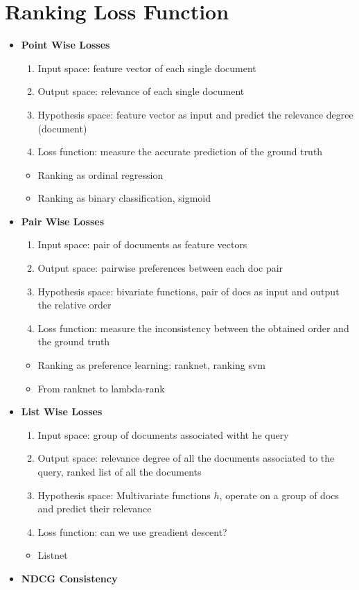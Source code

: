 \documentclass[12pt,oneside]{report}
\begin{document}
\chapter{Ranking Loss Function}
\begin{itemize}
    \item \textbf{Point Wise Losses}
    \begin{enumerate}
        \item Input space: feature vector of each single document
        \item Output space: relevance of each single document
        \item Hypothesis space: feature vector as input and predict the relevance degree (document)
        \item Loss function: measure the accurate prediction of the ground truth
    \end{enumerate}
    \begin{itemize}
        \item Ranking as ordinal regression
        \item Ranking as binary classification, sigmoid
    \end{itemize}
    \item \textbf{Pair Wise Losses}
    \begin{enumerate}
        \item Input space: pair of documents as feature vectors
        \item Output space: pairwise preferences between each doc pair
        \item Hypothesis space: bivariate functions, pair of docs as input and output the relative order
        \item Loss function: measure the inconsistency between the obtained order and the ground truth
    \end{enumerate}
    \begin{itemize}
        \item Ranking as preference learning: ranknet, ranking svm
        \item From ranknet to lambda-rank
    \end{itemize}
    \item \textbf{List Wise Losses}
    \begin{enumerate}
        \item Input space: group of documents associated witht he query
        \item Output space: relevance degree of all the documents associated to the query, ranked list of all the documents
        \item Hypothesis space: Multivariate functions \(h\), operate on a group of docs and predict their relevance
        \item Loss function: can we use greadient descent?
    \end{enumerate}
    \begin{itemize}
        \item Listnet
    \end{itemize}
    \item \textbf{NDCG Consistency}
\end{itemize}
\end{document}
